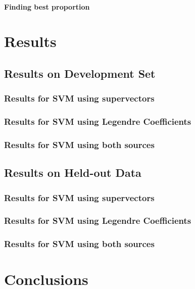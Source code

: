 \documentclass[11pt,a4paper]{tesis}
\begin{document}
			\subsubsection{Finding best proportion}

\chapter{Results}
	\section{Results on Development Set}
		\subsection{Results for SVM using supervectors}
		\subsection{Results for SVM using Legendre Coefficients}
		\subsection{Results for SVM using both sources}
	\section{Results on Held-out Data}
		\subsection{Results for SVM using supervectors}
		\subsection{Results for SVM using Legendre Coefficients}
		\subsection{Results for SVM using both sources}
\chapter{Conclusions}
 
\end{document}
